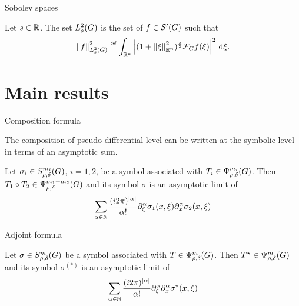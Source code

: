 \documentclass{beamer}
\begin{document}
\begin{frame}
    {Sobolev spaces}

    \begin{definition}
        Let $s \in \mathbb{R}$.
        The set $L^2_{s}(G)$ is the set of $f \in {\mathcal{S}' (G)}$ such that
        \begin{align*}
            \norm [\Sobolev s] f^2
            \defeq \int_{\R^n} \abs{(1 + \norm [\R^n] \xi^2)^\frac s 2 \Fourier f(\xi)}^2 \dd \xi.
        \end{align*}
    \end{definition}
\end{frame}

\section{Main results}

\begin{frame}
    {Composition formula}

    The composition of pseudo-differential level can be written at the symbolic level in terms of an asymptotic sum.

    \begin{theorem}

        Let $\sigma_i \in S^{m_i}_{\rho, \delta}(G)$, $i = 1, 2$,
        be a symbol associated with $T_i \in \Psi^{m_i}_{\rho, \delta}(G)$.
        Then $T_1 \circ T_2 \in \Psi^{m_1 + m_2}_{\rho, \delta}(G)$ and its symbol $\sigma$ is an asymptotic limit of
        \begin{align*}
            \sum_{\alpha \in \N} \frac {(\i \turn)^{\abs \alpha}} {\alpha!} 
            \iD {\xi^\alpha} \sigma_1(x, \xi)
            \iD {x^\alpha} \sigma_2(x, \xi)
        \end{align*}
    \end{theorem}
\end{frame}

\begin{frame}
    {Adjoint formula}

    \begin{theorem}

        Let $\sigma \in S^{m}_{\rho, \delta}(G)$
        be a symbol associated with $T \in \Psi^{m}_{\rho, \delta}(G)$.
        Then ${T}^\star \in \Psi^{m}_{\rho, \delta}(G)$ and its symbol $\sigma^{(*)}$ is an asymptotic limit of
        \begin{align*}
            \sum_{\alpha \in \N} \frac {(\i \turn)^{\abs \alpha}} {\alpha!} 
            \iD {\xi^\alpha} \iD {x^\alpha} \adj \sigma(x, \xi)
        \end{align*}
    \end{theorem}
\end{frame}
\end{document}
